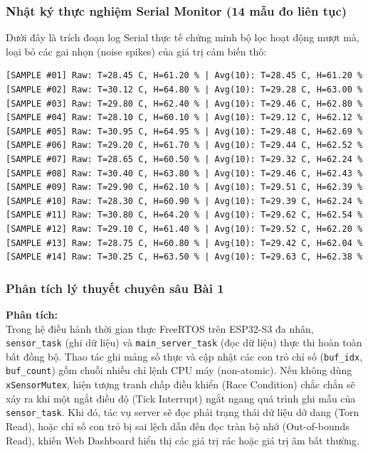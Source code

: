 \subsubsection{Nhật ký thực nghiệm Serial Monitor (14 mẫu đo liên tục)}
Dưới đây là trích đoạn log Serial thực tế chứng minh bộ lọc hoạt động mượt mà, loại bỏ các gai nhọn (noise spikes) của giá trị cảm biến thô:
\begin{lstlisting}[language={}]
[SAMPLE #01] Raw: T=28.45 C, H=61.20 % | Avg(10): T=28.45 C, H=61.20 %
[SAMPLE #02] Raw: T=30.12 C, H=64.80 % | Avg(10): T=29.28 C, H=63.00 %
[SAMPLE #03] Raw: T=29.80 C, H=62.40 % | Avg(10): T=29.46 C, H=62.80 %
[SAMPLE #04] Raw: T=28.10 C, H=60.10 % | Avg(10): T=29.12 C, H=62.12 %
[SAMPLE #05] Raw: T=30.95 C, H=64.95 % | Avg(10): T=29.48 C, H=62.69 %
[SAMPLE #06] Raw: T=29.20 C, H=61.70 % | Avg(10): T=29.44 C, H=62.52 %
[SAMPLE #07] Raw: T=28.65 C, H=60.50 % | Avg(10): T=29.32 C, H=62.24 %
[SAMPLE #08] Raw: T=30.40 C, H=63.80 % | Avg(10): T=29.46 C, H=62.43 %
[SAMPLE #09] Raw: T=29.90 C, H=62.10 % | Avg(10): T=29.51 C, H=62.39 %
[SAMPLE #10] Raw: T=28.30 C, H=60.90 % | Avg(10): T=29.39 C, H=62.24 %
[SAMPLE #11] Raw: T=30.80 C, H=64.20 % | Avg(10): T=29.62 C, H=62.54 %
[SAMPLE #12] Raw: T=29.10 C, H=61.40 % | Avg(10): T=29.52 C, H=62.20 %
[SAMPLE #13] Raw: T=28.75 C, H=60.80 % | Avg(10): T=29.42 C, H=62.04 %
[SAMPLE #14] Raw: T=30.25 C, H=63.50 % | Avg(10): T=29.63 C, H=62.38 %
\end{lstlisting}

\subsubsection{Phân tích lý thuyết chuyên sâu Bài 1}
\begin{tcolorbox}[colback=blue!5,colframe=blue!75!black,title=\textbf{Câu hỏi lý thuyết 1: Vì sao bắt buộc phải sử dụng Mutex và hệ quả nếu không có?}]
\textbf{Phân tích:} \\
Trong hệ điều hành thời gian thực FreeRTOS trên ESP32-S3 đa nhân, \texttt{sensor\_task} (ghi dữ liệu) và \texttt{main\_server\_task} (đọc dữ liệu) thực thi hoàn toàn bất đồng bộ. Thao tác ghi mảng số thực và cập nhật các con trỏ chỉ số (\texttt{buf\_idx}, \texttt{buf\_count}) gồm chuỗi nhiều chỉ lệnh CPU máy (non-atomic). Nếu không dùng \texttt{xSensorMutex}, hiện tượng tranh chấp điều khiển (Race Condition) chắc chắn sẽ xảy ra khi một ngắt điều độ (Tick Interrupt) ngắt ngang quá trình ghi mẫu của \texttt{sensor\_task}. Khi đó, tác vụ server sẽ đọc phải trạng thái dữ liệu dở dang (Torn Read), hoặc chỉ số con trỏ bị sai lệch dẫn đến đọc tràn bộ nhớ (Out-of-bounds Read), khiến Web Dashboard hiển thị các giá trị rác hoặc giá trị âm bất thường.
\end{tcolorbox}

